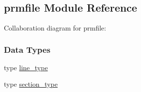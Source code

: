 \hypertarget{classprmfile}{\subsection{prmfile Module Reference}
\label{classprmfile}
}


Collaboration diagram for prmfile\-:
\subsubsection*{Data Types}
\begin{DoxyCompactItemize}
\item 
type \hyperlink{structprmfile_1_1line__type}{line\-\_\-type}
\item 
type \hyperlink{structprmfile_1_1section__type}{section\-\_\-type}
\end{DoxyCompactItemize}
